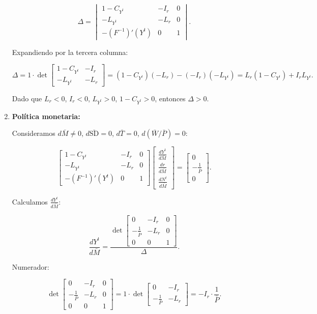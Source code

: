 \documentclass[
  doc,
  floatsintext,
  longtable,
  a4paper,
  nolmodern,
  notxfonts,
  notimes,
  colorlinks=true,linkcolor=blue,citecolor=blue,urlcolor=blue]{apa7}
\begin{document}
\begin{enumerate}
  \[
  \Delta = \begin{vmatrix}
  1 - C_{Y^t} & -I_r & 0 \\
  -L_{Y^t} & -L_r & 0 \\
  -(F^{-1})'(Y^t) & 0 & 1
  \end{vmatrix}.
  \]

  Expandiendo por la tercera columna:

  \[
  \Delta = 1 \cdot \det \begin{bmatrix}
  1 - C_{Y^t} & -I_r \\
  -L_{Y^t} & -L_r
  \end{bmatrix} = (1 - C_{Y^t})(-L_r) - (-I_r)(-L_{Y^t}) = L_r (1 - C_{Y^t}) + I_r L_{Y^t}.
  \]

  Dado que \(L_r < 0\), \(I_r < 0\), \(L_{Y^t} > 0\),
  \(1 - C_{Y^t} > 0\), entonces \(\Delta > 0\).
\item
  \textbf{Política monetaria:}

  Consideramos \(d\bar{M} \neq 0\), \(d\bar{\mathrm{SD}} = 0\),
  \(d\bar{T} = 0\), \(d(\bar{W}/\bar{P}) = 0\):

  \[
  \begin{bmatrix}
  1 - C_{Y^t} & -I_r & 0 \\
  -L_{Y^t} & -L_r & 0 \\
  -(F^{-1})'(Y^t) & 0 & 1
  \end{bmatrix}
  \begin{bmatrix}
  \frac{dY^t}{d\bar{M}} \\
  \frac{dr}{d\bar{M}} \\
  \frac{dN^t}{d\bar{M}}
  \end{bmatrix}
  =
  \begin{bmatrix}
  0 \\
  -\frac{1}{\bar{P}} \\
  0
  \end{bmatrix}.
  \]

  Calculamos \(\frac{dY^t}{d\bar{M}}\):

  \[
  \frac{dY^t}{d\bar{M}} = \frac{\det \begin{bmatrix}
  0 & -I_r & 0 \\
  -\frac{1}{\bar{P}} & -L_r & 0 \\
  0 & 0 & 1
  \end{bmatrix}}{\Delta}.
  \]

  Numerador:

  \[
  \det \begin{bmatrix}
  0 & -I_r & 0 \\
  -\frac{1}{\bar{P}} & -L_r & 0 \\
  0 & 0 & 1
  \end{bmatrix} = 1 \cdot \det \begin{bmatrix}
  0 & -I_r \\
  -\frac{1}{\bar{P}} & -L_r
  \end{bmatrix} = -I_r \cdot \frac{1}{\bar{P}}.
  \]


\end{enumerate}
\end{document}
